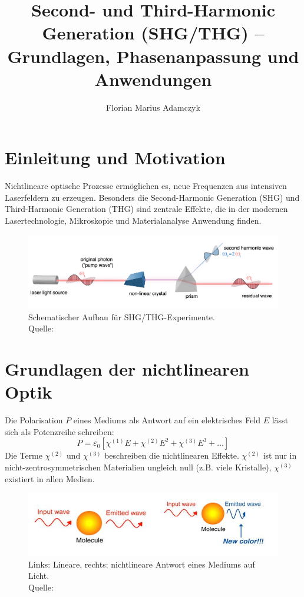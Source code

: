\documentclass[9pt,a4paper,twocolumn,twoside]{tau-class/tau}
\title{Second- und Third-Harmonic Generation (SHG/THG) – Grundlagen, Phasenanpassung und Anwendungen}
\author[a,1]{Florian Marius Adamczyk}
\affil[a]{Justus-Liebig-Universität Gießen, Institut für Physik, Deutschland}
\newcommand{\figcite}[1]{\\[-3mm]{\tiny Quelle: \cite{#1}}}
\begin{document}
		
    \maketitle 
    \thispagestyle{firststyle} 
    \tauabstract 
    

\section{Einleitung und Motivation}
Nichtlineare optische Prozesse ermöglichen es, neue Frequenzen aus intensiven Laserfeldern zu erzeugen. Besonders die Second-Harmonic Generation (SHG) und Third-Harmonic Generation (THG) sind zentrale Effekte, die in der modernen Lasertechnologie, Mikroskopie und Materialanalyse Anwendung finden.

\begin{figure}[!ht]
\centering
\includegraphics[width=0.6\columnwidth]{figures/experimental.png}
\caption{Schematischer Aufbau für SHG/THG-Experimente.\figcite{JkwchuiImage}}
\end{figure}


\section{Grundlagen der nichtlinearen Optik}
Die Polarisation $P$ eines Mediums als Antwort auf ein elektrisches Feld $E$ lässt sich als Potenzreihe schreiben:
\begin{equation}
P = \varepsilon_0\left[\chi^{(1)}E + \chi^{(2)}E^2 + \chi^{(3)}E^3 + \dots\right]
\end{equation}
Die Terme $\chi^{(2)}$ und $\chi^{(3)}$ beschreiben die nichtlinearen Effekte. $\chi^{(2)}$ ist nur in nicht-zentrosymmetrischen Materialien ungleich null (z.B. viele Kristalle), $\chi^{(3)}$ existiert in allen Medien.

\begin{figure}[!ht]
\centering
\includegraphics[width=0.6\columnwidth]{../praes/Images/Fig.1 optics.jpeg}
\caption{Links: Lineare, rechts: nichtlineare Antwort eines Mediums auf Licht.\figcite{Science20NonlinearOptics2014}}
\end{figure}
\end{document}

